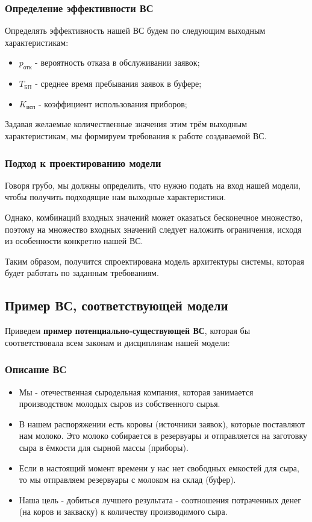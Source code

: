 \documentclass[a4paper, 14pt]{article}
\begin{document}
\subsubsection{Определение эффективности ВС}

Определять эффективность нашей ВС будем по следующим выходным характеристикам:

\begin{itemize}
	\item $p_\text{отк}$ - вероятность отказа в обслуживании заявок;
	\item $T_\text{БП}$ - среднее время пребывания заявок в буфере;
	\item $K_\text{исп}$ - коэффициент использования приборов;
\end{itemize}

Задавая желаемые количественные значения этим трём выходным характеристикам, мы формируем требования к работе создаваемой ВС.

\subsubsection{Подход к проектированию модели}

Говоря грубо, мы должны определить, что нужно подать на вход нашей модели, чтобы получить подходящие нам выходные характеристики.

Однако, комбинаций входных значений может оказаться бесконечное множество, поэтому на множество входных значений следует наложить ограничения, исходя из особенности конкретно нашей ВС.

Таким образом, получится спроектирована модель архитектуры системы, которая будет работать по заданным требованиям.

\subsection{Пример ВС, соответствующей модели}


Приведем \textbf{пример потенциально-существующей ВС}, которая бы соответствовала всем законам и дисциплинам нашей модели:


\subsubsection{Описание ВС}

\begin{itemize}
	\item Мы - отечественная сыродельная компания, которая занимается производством молодых сыров из собственного сырья.
	\item В нашем распоряжении есть коровы (источники заявок), которые поставляют нам молоко. Это молоко собирается в резервуары и отправляется на заготовку сыра в ёмкости для сырной массы (приборы).
	\item Если в настоящий момент времени у нас нет свободных емкостей для сыра, то мы отправляем резервуары с молоком на склад (буфер).
	\item Наша цель - добиться лучшего результата - соотношения потраченных денег (на коров и закваску) к количеству производимого сыра.
\end{itemize}
\end{document}
